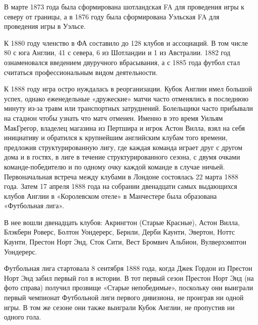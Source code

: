В марте 1873 года была сформирована шотландская FA для проведения игры к северу от границы, а в 1876 году была сформирована Уэльская FA для проведения игры в Уэльсе.

К 1880 году членство в ФА составило до 128 клубов и ассоциаций. В том числе 80 с юга Англии, 41 с севера, 6 из Шотландии и 1 из Австралии. 1882 год ознаменовался введением двуручного вбрасывания, а с 1885 года футбол стал считаться профессиональным видом деятельности.

К 1888 году игра остро нуждалась в реорганизации. Кубок Англии имел большой успех, однако еженедельные «дружеские» матчи часто отменялись в последнюю минуту из-за травм или транспортных затруднений. Болельщики часто прибывали на стадион чтобы узнать что матч отменен. Именно в это время Уильям МакГрегор, владелец магазина из Пертшира и игрок Астон Вилла, взял на себя инициативу и обратился к крупнейшим английским клубам того времени, предложив структурированную лигу, где каждая команда играет друг с другом дома и в гостях, в лиге в течение структурированного сезона, с двумя очками команде-победителю и по одному очку каждой команде в случае ничьей. Первоначальная встреча между клубами в Лондоне состоялась 22 марта 1888 года. Затем 17 апреля 1888 года на собрании двенадцати самых выдающихся клубов Англии в «Королевском отеле» в Манчестере была образована «Футбольная лига».

В нее вошли двенадцать клубов:
Акрингтон (Старые Красные),
Астон Вилла,
Блэкберн Роверс,
Болтон Уондерерс,
Бернли,
Дерби Каунти,
Эвертон,
Ноттс Каунти,
Престон Норт Энд,
Сток Сити,
Вест Бромвич Альбион,
Вулверхэмптон Уондерерс.

Футбольная лига стартовала 8 сентября 1888 года, когда Джек Гордон из Престон Норт Энд забил первый гол в истории. В тот первый сезон Престон Норт Энд (на фото справа) получил прозвище «Старые непобедимые», поскольку они выиграли первый чемпионат Футбольной лиги первого дивизиона, не проиграв ни одной игры.  В том же сезоне они также выиграли Кубок Англии, не пропустив ни одного гола.



